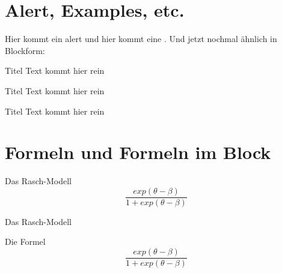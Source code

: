 \documentclass[aspectratio=1610]{beamer}
\begin{document}
\section{Alert, Examples, etc.}
\begin{frame}
	Hier kommt ein \alert{alert} und hier kommt eine . Und jetzt nochmal ähnlich in Blockform:
	
	\begin{block}{Titel}
		Text kommt hier rein
	\end{block}
	
	\begin{alertblock}{Titel}
		Text kommt hier rein
	\end{alertblock}
	
	\begin{exampleblock}{Titel}
		Text kommt hier rein
	\end{exampleblock}
\end{frame}

\section{Formeln und Formeln im Block}
\begin{frame}{Das Rasch-Modell}
	\begin{equation}
		\frac{exp(\theta-\beta)}{1+exp(\theta-\beta)}
	\end{equation}
\end{frame}

\begin{frame}{Das Rasch-Modell}
	
	\begin{block}{Die Formel}
		\LARGE
			\begin{equation}
			\frac{exp(\theta-\beta)}{1+exp(\theta-\beta)}
		\end{equation}
	\end{block}
\end{frame}
\end{document}
